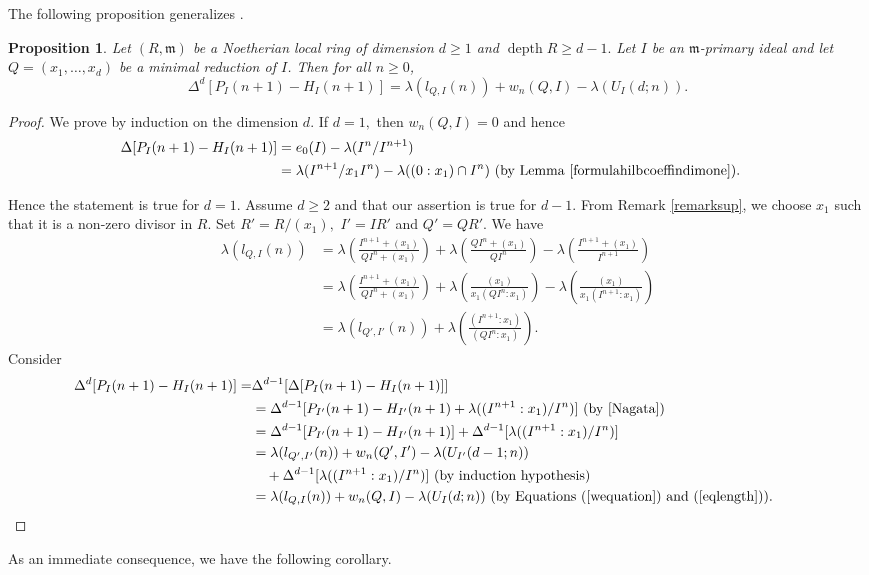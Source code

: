 \documentclass[reqno,a4paper,dvipsnames]{amsart}
\newcommand{\m}{\mathfrak{m} }
\newcommand{\depth}{\operatorname{depth}}
\newtheorem{proposition}[theorem]{Proposition}
\theoremstyle{definition}
\begin{document}
The following proposition generalizes  \cite[Theorem~2.4]{sam}. 

\begin{proposition} \label{hilbcoeffextension}
    Let $(R,\m)$ be a Noetherian local ring of dimension $d \geq 1$ and $\depth R \geq d-1.$ Let $I$ be an $\m$-primary ideal  and let $Q=(x_{1},\ldots,x_{d})$ be a minimal reduction of $I$. 
     Then for all $n\geq 0$, 
    \begin{equation*}
    \Delta^{d}[P_{I}(n+1)-H_{I}(n+1)]=\lambda(l_{Q,I}(n))+w_{n}(Q,I)-\lambda(U_{I}(d;n)).
    \end{equation*}

\end{proposition}
\begin{proof}
 We prove by induction on the dimension $d.$ If  $d=1,$ then  $w_{n}(Q,I)=0$ and hence
   \begin{align*}
    \Delta[P_{I}(n+1)-H_{I}(n+1)]&=e_{0}(I)-\lambda(I^{n}/I^{n+1}) & \\
     &=\lambda(I^{n+1}/x_1 I^{n}) - \lambda((0:x_{1})\cap I^{n})
      \mbox{ (by Lemma \ref{formulahilbcoeffindimone})}. 
   \end{align*}
   
 Hence the statement is true for $d=1$.
Assume $d \geq 2$ and that our assertion is true  for $d-1.$  
From Remark \ref{remarksup}, we choose $x_1$ such that it is a non-zero divisor in $R$. Set $R'=R/(x_{1}),$ $I'=IR'$ and $Q'=QR'.$  We have
   \begin{align} \label{eqlength}  \nonumber
       \lambda(l_{Q,I}(n))
 &=\lambda\left(\frac{I^{n+1}+(x_{1})}{QI^{n}+(x_{1})}\right)
       +\lambda\left(\frac{QI^{n}+(x_{1})}{QI^{n}}\right)
       -\lambda\left(\frac{I^{n+1}+(x_{1})}{I^{n+1}}\right)\\ \nonumber
&=\lambda\left(\frac{{I}^{n+1}+(x_{1})}{{QI^{n}}+(x_{1})}\right)
       + \lambda\left(\frac{(x_{1})}{ x_1(QI^{n}:x_{1}) } \right)
       -  \lambda\left(\frac{(x_{1})}{ x_1(I^{n+1}:x_{1})}  \right)\\ 
       &= \lambda(l_{Q',I'}(n))
       + \lambda\left(\frac{(I^{n+1}:x_{1})}{ (QI^{n}:x_{1}) } \right).
   \end{align}
 Consider
  \begin{align*}  \nonumber
    \Delta^{d}[P_{I}(n+1)-H_{I}(n+1)]=& \Delta^{d-1}[\Delta[P_{I}(n+1)-H_{I}(n+1)]] & \\\nonumber
    &=\Delta^{d-1}[P_{I'}(n+1)-H_{I'}(n+1)+\lambda((I^{n+1}:x_{1})/I^{n})]  \text{ (by \cite[22.6]{Nagata})} & \\
    &=\Delta^{d-1}[P_{I'}(n+1)-H_{I'}(n+1)]+\Delta^{d-1}[\lambda((I^{n+1}:x_{1})/I^{n})] \\
    &= \lambda(l_{Q',I'}(n))+w_{n}(Q',I') -\lambda (U_{I'}(d-1;n))\\
   & \quad + \Delta^{d-1}[\lambda((I^{n+1}:x_{1})/I^{n})]  \text{ (by induction hypothesis)}\\ \nonumber
        &= \lambda(l_{Q,I}(n))+w_{n}(Q,I) 
        -\lambda (U_{I}(d;n)) \text{ (by Equations (\ref{wequation}) and (\ref{eqlength}))}. &&\qedhere
\end{align*} 
\end{proof}
As an immediate consequence,  we have the following corollary.
\end{document}
